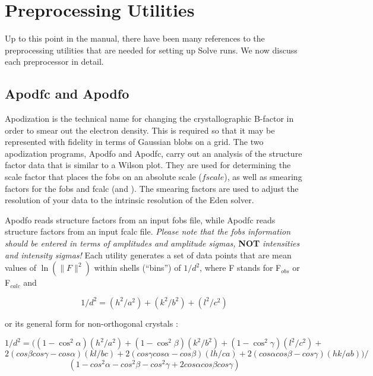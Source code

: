 \documentclass{report}
\begin{document}
{\chapter {Preprocessing Utilities}
\label{preprocessors}

Up to this point in the manual,
there have been many references to the preprocessing utilities that are needed
for setting up Solve runs.
We now discuss each preprocessor in detail.

\section {Apodfc and Apodfo}
\label{preprocessors-apod}

Apodization is the technical name for changing the crystallographic B-factor 
in order to smear out the electron density.  This is required so that it may be 
represented with fidelity in terms of Gaussian blobs on a grid.
The two apodization programs, Apodfo and Apodfc, carry
out an analysis of the structure factor data 
that is similar to a Wilson plot.  They are used for
determining the scale factor that places the fobs on an absolute scale
($fscale$), as well as smearing factors for the fobs and fcalc 
(\delfo and \delfc).
The smearing factors are used to adjust the resolution of your data
to the intrinsic resolution of the Eden solver.

\vspace {0.1in}

Apodfo reads structure factors from an input fobs file, while
Apodfc reads structure factors from an input fcalc file. 
{\it Please note that the fobs information should be entered
in terms of amplitudes
and amplitude sigmas, }{\bf NOT } {\it intensities and intensity sigmas!}
Each utility generates a set of data points that are 
mean values of $\ln(\|F\|^2)$ within shells (``bins'') 
of $1/d^2$, where F stands for F$_{obs}$ or F$_{calc}$ and 

$$ 1/d^2 = (h^2/a^2) + (k^2/b^2) + (l^2/c^2) $$

or its general form for non-orthogonal crystals \cite{glusker}:

$$ 1/d^2 = ((1 - \cos^2\alpha)(h^2/a^2) + 
            (1 - \cos^2\beta)(k^2/b^2) + 
            (1 - \cos^2\gamma)(l^2/c^2) + $$
$$          2(cos\beta cos\gamma- cos\alpha)(kl/bc) +
            2(cos\gamma cos\alpha- cos\beta)(lh/ca) +
            2(cos\alpha cos\beta- cos\gamma)(hk/ab)) / $$
$$       (1 - cos^2\alpha - cos^2\beta - cos^2\gamma + 2cos\alpha cos\beta cos\gamma) $$

}
\end{document}
